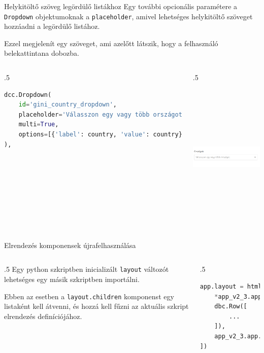 \documentclass[english, aspectratio=169]{beamer}
\begin{document}
	\begin{frame}[fragile]{Helykitöltő szöveg legördülő listákhoz}
		Egy további opcionális paramétere a \texttt{Dropdown} objektumoknak a \texttt{placeholder}, amivel lehetséges helykitöltő szöveget hozzáadni a legördülő listához.\par\smallskip
		Ezzel megjelenít egy szöveget, ami azelőtt látszik, hogy a felhasználó belekattintana dobozba.
		\begin{columns}
			\begin{column}{.5\textwidth}
				\begin{lstlisting}[language=python]
dcc.Dropdown(
	id='gini_country_dropdown',
	placeholder='Válasszon egy vagy több országot',
	multi=True,
	options=[{'label': country, 'value': country} for country in gini_df['Country Name'].unique()]
),				
				\end{lstlisting}
			\end{column}
			\begin{column}{.5\textwidth}
				\begin{center}
					\includegraphics[width=7cm, height=7cm, keepaspectratio]{images/plots_26.png}
				\end{center}
			\end{column}
		\end{columns}
	\end{frame}
	
	\begin{frame}[fragile]{Elrendezés komponensek újrafelhasználása}
		\begin{columns}
			\begin{column}{.5\textwidth}
				Egy python szkriptben inicializált \texttt{layout} változót lehetséges egy másik szkriptben importálni.\par\medskip
				Ebben az esetben a \texttt{layout.children} komponenst egy listaként kell átvenni, és hozzá kell fűzni az aktuális szkript elrendezés definíciójához.
			\end{column}
			\begin{column}{.5\textwidth}
				\begin{lstlisting}[language=python]
app.layout = html.Div([
	*app_v2_3.app.layout.children[:-1],
	dbc.Row([
		...	
	]),
	app_v2_3.app.layout.children[-1]
])				
				\end{lstlisting}			
			\end{column}
		\end{columns}
	\end{frame}
	
\end{document}
